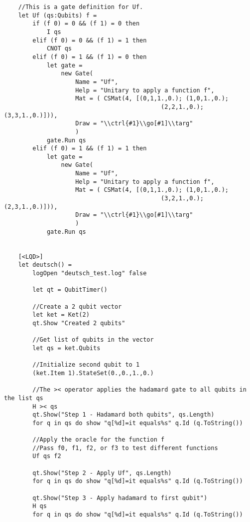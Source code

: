 \documentclass{article}
\theoremstyle{plain}
\theoremstyle{definition}
\theoremstyle{remark}
\begin{document}
\begin{verbatim}
    //This is a gate definition for Uf. 
    let Uf (qs:Qubits) f = 
        if (f 0) = 0 && (f 1) = 0 then 
            I qs
        elif (f 0) = 0 && (f 1) = 1 then
            CNOT qs
        elif (f 0) = 1 && (f 1) = 0 then           
            let gate = 
                new Gate(
                    Name = "Uf",
                    Help = "Unitary to apply a function f",
                    Mat = ( CSMat(4, [(0,1,1.,0.); (1,0,1.,0.);
                                            (2,2,1.,0.); (3,3,1.,0.)])),
                    Draw = "\\ctrl{#1}\\go[#1]\\targ"
                    )
            gate.Run qs
        elif (f 0) = 1 && (f 1) = 1 then
            let gate = 
                new Gate(
                    Name = "Uf",
                    Help = "Unitary to apply a function f",
                    Mat = ( CSMat(4, [(0,1,1.,0.); (1,0,1.,0.);
                                            (3,2,1.,0.); (2,3,1.,0.)])),
                    Draw = "\\ctrl{#1}\\go[#1]\\targ"
                    )
            gate.Run qs
   

    [<LQD>]
    let deutsch() =
        logOpen "deutsch_test.log" false
      
        let qt = QubitTimer()
        
        //Create a 2 qubit vector
        let ket = Ket(2)
        qt.Show "Created 2 qubits"
        
        //Get list of qubits in the vector
        let qs = ket.Qubits

        //Initialize second qubit to 1
        (ket.Item 1).StateSet(0.,0.,1.,0.)

        //The >< operator applies the hadamard gate to all qubits in the list qs
        H >< qs
        qt.Show("Step 1 - Hadamard both qubits", qs.Length)
        for q in qs do show "q[%d]=it equals%s" q.Id (q.ToString())

        //Apply the oracle for the function f 
        //Pass f0, f1, f2, or f3 to test different functions
        Uf qs f2

        qt.Show("Step 2 - Apply Uf", qs.Length)
        for q in qs do show "q[%d]=it equals%s" q.Id (q.ToString())

        qt.Show("Step 3 - Apply hadamard to first qubit")
        H qs
        for q in qs do show "q[%d]=it equals%s" q.Id (q.ToString())
        

\end{verbatim}
\end{document}
